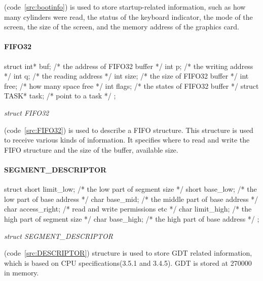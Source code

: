 \documentclass{swfcthesis}
\begin{document}
(code~\ref{src:bootinfo}) is used to store startup-related
information, such as how many cylinders were read, the status of the keyboard indicator,
the mode of the screen, the size of the screen, and the memory address of the graphics
card.


\paragraph{FIFO32}

\begin{listing}[H]
  \begin{codeblock}
\begin{ccode}
struct 
{ 
  int* buf;          /* the address of FIFO32 buffer */
  int p;             /* the writing address */
  int q;             /* the reading address */
  int size;          /* the size of FIFO32 buffer */
  int free;          /* how many space free */
  int flags;         /* the states of FIFO32 buffer */
  struct TASK* task; /* point to a task */ 
};
\end{ccode}
  \end{codeblock}
  \caption{\emph{struct FIFO32}}\label{src:FIFO32}
\end{listing}

(code~\ref{src:FIFO32}) is used to
describe a FIFO structure. This structure is used to receive various kinds of
information. It specifies where to read and write the FIFO structure and the size of the
buffer, available size.


\paragraph{SEGMENT\_DESCRIPTOR}

\begin{listing}[H]
  \begin{codeblock}
\begin{ccode}
struct 
{ 
  short limit_low;   /* the low part of segment size */
  short base_low;    /* the low part of base address */
  char base_mid;     /* the middle part of base address */
  char access_right; /* read and write permissions etc */
  char  limit_high;  /* the high part of segment size */
  char base_high;    /* the high part of base address */
};
\end{ccode}
  \end{codeblock}
  \caption{\emph{struct SEGMENT\_DESCRIPTOR}}\label{src:DESCRIPTOR}
\end{listing}

(code~\ref{src:DESCRIPTOR}) structure is
used to store GDT related information, which is based on CPU specifications(3.5.1 and
3.4.5\cite{intel_3a}). GDT is stored at 270000 in memory.
\end{document}
